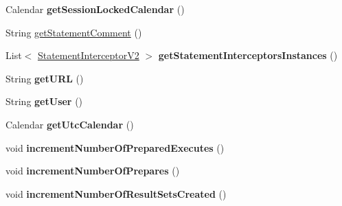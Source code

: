 \begin{DoxyCompactItemize}
Calendar {\bfseries get\+Session\+Locked\+Calendar} ()
\item 
String \mbox{\hyperlink{interfacecom_1_1mysql_1_1jdbc_1_1_my_s_q_l_connection_aca7bbebb7ec6fa745218e6dca38cfaad}{get\+Statement\+Comment}} ()
\item 
\mbox{\label{interfacecom_1_1mysql_1_1jdbc_1_1_my_s_q_l_connection_a52b22324f05662ded06f4017b57a81b3}} 
List$<$ \mbox{\hyperlink{interfacecom_1_1mysql_1_1jdbc_1_1_statement_interceptor_v2}{Statement\+Interceptor\+V2}} $>$ {\bfseries get\+Statement\+Interceptors\+Instances} ()
\item 
\mbox{\label{interfacecom_1_1mysql_1_1jdbc_1_1_my_s_q_l_connection_a536a4711c6abe0b1f259fb770db3cd15}} 
String {\bfseries get\+U\+RL} ()
\item 
\mbox{\label{interfacecom_1_1mysql_1_1jdbc_1_1_my_s_q_l_connection_a9458c2e9586cf733eae35a97d9ada10f}} 
String {\bfseries get\+User} ()
\item 
\mbox{\label{interfacecom_1_1mysql_1_1jdbc_1_1_my_s_q_l_connection_a7c399c24c15c33bcb79d0b6165b852d0}} 
Calendar {\bfseries get\+Utc\+Calendar} ()
\item 
\mbox{\label{interfacecom_1_1mysql_1_1jdbc_1_1_my_s_q_l_connection_a635ccdb54f5d3564238a2feefddc6eb0}} 
void {\bfseries increment\+Number\+Of\+Prepared\+Executes} ()
\item 
\mbox{\label{interfacecom_1_1mysql_1_1jdbc_1_1_my_s_q_l_connection_ad503a7cedf7e8ea2a7eea6d60a8bb88f}} 
void {\bfseries increment\+Number\+Of\+Prepares} ()
\item 
\mbox{\label{interfacecom_1_1mysql_1_1jdbc_1_1_my_s_q_l_connection_a1063be5bc745f463461e8dfb63ec0406}} 
void {\bfseries increment\+Number\+Of\+Result\+Sets\+Created} ()
\item 
\mbox{\label{interfacecom_1_1mysql_1_1jdbc_1_1_my_s_q_l_connection_ad0e763d6b7d537dbee3be983331f0674}} 

\end{DoxyCompactItemize}
